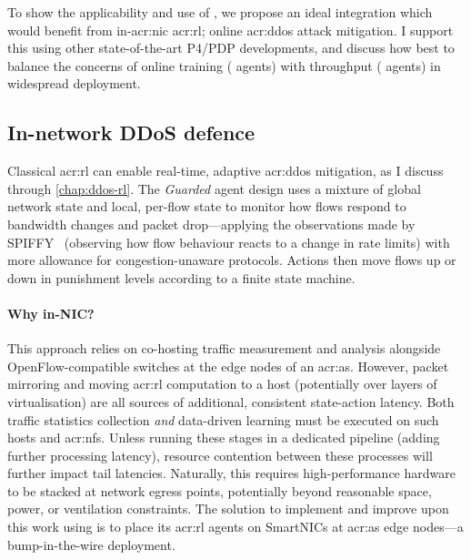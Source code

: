 To show the applicability and use of \approachshort{}, we propose an ideal integration which would benefit from in-\gls{acr:nic} \gls{acr:rl}; online \gls{acr:ddos} attack mitigation.
I support this using other state-of-the-art P4/PDP developments, and discuss how best to balance the concerns of online training (\Coopfw{} agents) with throughput (\Indfw{} agents) in widespread deployment.


\subsection{In-network DDoS defence}\label{sec:integ-1}
Classical \gls{acr:rl} can enable real-time, adaptive \gls{acr:ddos} mitigation, as I discuss through \cref{chap:ddos-rl}.
The \emph{Guarded} agent design uses a mixture of global network state and local, per-flow state to monitor how flows respond to bandwidth changes and packet drop---applying the observations made by SPIFFY~\parencite{DBLP:conf/ndss/KangGS16} (observing how flow behaviour reacts to a change in rate limits) with more allowance for congestion-unaware protocols.
Actions then move flows up or down in punishment levels according to a finite state machine.

\paragraph{Why in-NIC?}
This approach relies on co-hosting traffic measurement and analysis alongside OpenFlow-compatible switches at the edge nodes of an \gls{acr:as}.
However, packet mirroring and moving \gls{acr:rl} computation to a host (potentially over layers of virtualisation) are all sources of additional, consistent state-action latency.
Both traffic statistics collection \emph{and} data-driven learning must be executed on such hosts and \glspl{acr:nf}.
Unless running these stages in a dedicated pipeline (adding further processing latency), resource contention between these processes will further impact tail latencies.
Naturally, this requires high-performance hardware to be stacked at network egress points, potentially beyond reasonable space, power, or ventilation constraints.
The solution to implement and improve upon this work using \approachshort{} is to place its \gls{acr:rl} agents on SmartNICs at \gls{acr:as} edge nodes---a bump-in-the-wire deployment.

